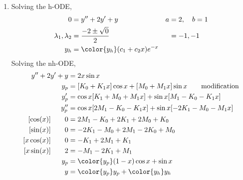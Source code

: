 \begin{enumerate}
    \item Solving the h-ODE,
          \begin{align}
              0                        & = y'' + 2y' + y                      & a & = 2, \quad b = 1 \\
              \lambda_{1}, \lambda_{2} & = \frac{-2 \pm \sqrt{0}}{2}          &   & = -1, -1         \\
              y_{h}                    & = \color{y_h} (c_{1} + c_{2}x)e^{-x}
          \end{align}
          Solving the nh-ODE,
          \begin{align}
              y'' + 2y' + y       & = 2x\sin x                                                                            \\
              y_{p}               & = [K_{0} + K_{1}x] \cos x + [M_{0} + M_{1}x]\sin x         \qquad \text{modification} \\
              y_{p}'              & = \cos x [K_{1} + M_{0} + M_{1}x] + \sin x [M_{1} - K_{0} - K_{1}x]                   \\
              y_{p}''             & = \cos x [2M_{1} - K_{0} - K_{1}x] + \sin x [-2K_{1} - M_{0} - M_{1}x]                \\
              [\cos(x)] \qquad 0  & =  2M_{1} - K_{0} + 2K_{1} + 2M_{0} + K_{0}                                           \\
              [\sin(x)] \qquad 0  & = -2K_{1} - M_{0} + 2M_{1} - 2K_{0} + M_{0}                                           \\
              [x\cos(x)] \qquad 0 & =  -K_{1} + 2M_{1} + K_{1}                                                            \\
              [x\sin(x)] \qquad 2 & = -M_{1} - 2K_{1} + M_{1}                                                             \\
              y_{p}               & = \color{y_p} (1-x)\cos x + \sin x                                                    \\
              y                   & = {\color{y_p} y_{p}} + {\color{y_h} y_{h}}
          \end{align}


\end{enumerate}
